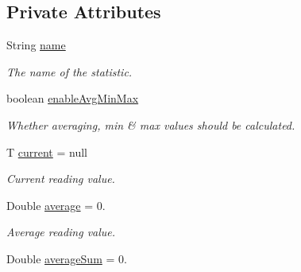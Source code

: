 \subsection*{Private Attributes}
\begin{DoxyCompactItemize}
\item 
\mbox{\label{class_android_app_1_1_data_item_a7e6d01c4d449403e707e99fce240b33b}} 
String \hyperlink{class_android_app_1_1_data_item_a7e6d01c4d449403e707e99fce240b33b}{name}
\begin{DoxyCompactList}\small\item\em The name of the statistic. \end{DoxyCompactList}\item 
\mbox{\label{class_android_app_1_1_data_item_a330d3ade00b732f202d73dbb0d3b711f}} 
boolean \hyperlink{class_android_app_1_1_data_item_a330d3ade00b732f202d73dbb0d3b711f}{enable\+Avg\+Min\+Max}
\begin{DoxyCompactList}\small\item\em Whether averaging, min \& max values should be calculated. \end{DoxyCompactList}\item 
\mbox{\label{class_android_app_1_1_data_item_aef9fad1dca931e60708187ab89769f54}} 
T \hyperlink{class_android_app_1_1_data_item_aef9fad1dca931e60708187ab89769f54}{current} = null
\begin{DoxyCompactList}\small\item\em Current reading value. \end{DoxyCompactList}\item 
\mbox{\label{class_android_app_1_1_data_item_a231634a35289bb35c46f7fa3111cd472}} 
Double \hyperlink{class_android_app_1_1_data_item_a231634a35289bb35c46f7fa3111cd472}{average} = 0.
\begin{DoxyCompactList}\small\item\em Average reading value. \end{DoxyCompactList}\item 
\mbox{\label{class_android_app_1_1_data_item_aa146ca811e2838ef5c5621c99c712cda}} 
Double \hyperlink{class_android_app_1_1_data_item_aa146ca811e2838ef5c5621c99c712cda}{average\+Sum} = 0.

\end{DoxyCompactItemize}
